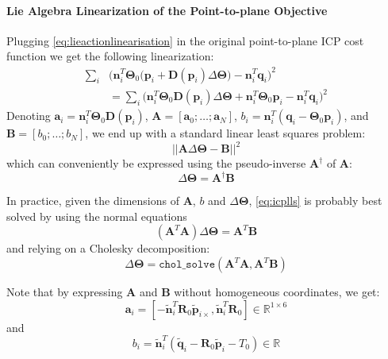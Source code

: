 \paragraph{Lie Algebra Linearization of the Point-to-plane Objective}
Plugging \eqref{eq:lieactionlinearisation} in the original point-to-plane ICP cost function we get the following linearization:
\begin{equation}
\begin{split}
\sum_i & \Big(\mathbf{n}_i^T \mathbf{\Theta}_0 \big(\mathbf{p}_i + \mathbf{D}(\mathbf{p}_i)\Delta\mathbf{\Theta} \big) - \mathbf{n}_i^T \mathbf{q}_i\Big)^2
\\
&= \sum_i \Big(\mathbf{n}_i^T \mathbf{\Theta}_0 \mathbf{D}(\mathbf{p}_i)\Delta\mathbf{\Theta} + \mathbf{n}_i^T \mathbf{\Theta}_0 \mathbf{p}_i - \mathbf{n}_i^T \mathbf{q}_i\Big)^2
\end{split}
\end{equation}
Denoting $\mathbf{a}_i = \mathbf{n}_i^T \mathbf{\Theta}_0 \mathbf{D}(\mathbf{p}_i)$, $\mathbf{A}=[\mathbf{a}_0;\ldots;\mathbf{a}_N]$,
$b_i = \mathbf{n}_i^T (\mathbf{q}_i - \mathbf{\Theta}_0 \mathbf{p}_i)$, and $\mathbf{B}=[b_0;\ldots;b_N]$, we end up with a standard linear least squares problem:
\begin{equation}\label{eq:icplls}
||\mathbf{A} \Delta\mathbf{\Theta} - \mathbf{B}||^2
\end{equation}
which can conveniently be expressed using the pseudo-inverse $\mathbf{A}^{\dagger}$ of $\mathbf{A}$:
\begin{equation}
\Delta\mathbf{\Theta} = \mathbf{A}^{\dagger} \mathbf{B}
\end{equation}

In practice, given the dimensions of $\mathbf{A}$, $b$ and $\Delta\mathbf{\Theta}$, \eqref{eq:icplls} is probably best solved by using the normal equations
\begin{equation}
(\mathbf{A}^T \mathbf{A}) \Delta\mathbf{\Theta} = \mathbf{A}^T \mathbf{B}
\end{equation}
and relying on a Cholesky decomposition:
\begin{equation}
\Delta\mathbf{\Theta} = \texttt{chol\_solve}(\mathbf{A}^T \mathbf{A}, \mathbf{A}^T \mathbf{B})
\end{equation}

Note that by expressing $\mathbf{A}$ and $\mathbf{B}$ without homogeneous coordinates, we get:
\begin{equation}
\mathbf{a}_i = [-\tilde{\mathbf{n}}_i^T \mathbf{R}_0 {{\tilde{\mathbf{p}}}_{i\times}}, \tilde{\mathbf{n}}_i^T \mathbf{R}_0] \in \mathbb{R}^{1\times6}
\end{equation}
and
\begin{equation}
b_i = \tilde{\mathbf{n}}_i^T (\tilde{\mathbf{q}}_i - \mathbf{R}_0 \tilde{\mathbf{p}}_i - T_0) \in \mathbb{R}
\end{equation}

